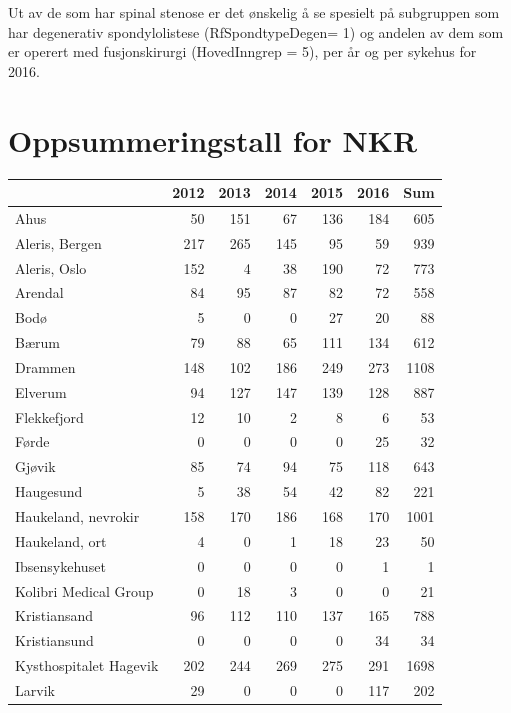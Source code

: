 \documentclass [norsk,a4paper,twoside]{article}\usepackage[]{graphicx}\usepackage[]{color}
\begin{document}
Ut av de som har spinal stenose er det ønskelig å se 
spesielt på subgruppen som har degenerativ spondylolistese (RfSpondtypeDegen= 1) og 
andelen av dem som er operert med fusjonskirurgi (HovedInngrep = 5), 
per år og 
per sykehus for 2016.

\section{Oppsummeringstall for NKR}

\begin{table}[ht]
\centering
\begin{tabular}{lrrrrrr}
  \hline
 & 2012 & 2013 & 2014 & 2015 & 2016 & Sum \\ 
  \hline
Ahus & 50 & 151 & 67 & 136 & 184 & 605 \\ 
  Aleris, Bergen & 217 & 265 & 145 & 95 & 59 & 939 \\ 
  Aleris, Oslo & 152 & 4 & 38 & 190 & 72 & 773 \\ 
  Arendal & 84 & 95 & 87 & 82 & 72 & 558 \\ 
  Bodø & 5 & 0 & 0 & 27 & 20 & 88 \\ 
  Bærum & 79 & 88 & 65 & 111 & 134 & 612 \\ 
  Drammen & 148 & 102 & 186 & 249 & 273 & 1108 \\ 
  Elverum & 94 & 127 & 147 & 139 & 128 & 887 \\ 
  Flekkefjord & 12 & 10 & 2 & 8 & 6 & 53 \\ 
  Førde & 0 & 0 & 0 & 0 & 25 & 32 \\ 
  Gjøvik & 85 & 74 & 94 & 75 & 118 & 643 \\ 
  Haugesund & 5 & 38 & 54 & 42 & 82 & 221 \\ 
  Haukeland, nevrokir & 158 & 170 & 186 & 168 & 170 & 1001 \\ 
  Haukeland, ort & 4 & 0 & 1 & 18 & 23 & 50 \\ 
  Ibsensykehuset & 0 & 0 & 0 & 0 & 1 & 1 \\ 
  Kolibri Medical Group & 0 & 18 & 3 & 0 & 0 & 21 \\ 
  Kristiansand & 96 & 112 & 110 & 137 & 165 & 788 \\ 
  Kristiansund & 0 & 0 & 0 & 0 & 34 & 34 \\ 
  Kysthospitalet Hagevik & 202 & 244 & 269 & 275 & 291 & 1698 \\ 
  Larvik & 29 & 0 & 0 & 0 & 117 & 202 \\ 

\end{tabular}
\end{table}
\end{document}
